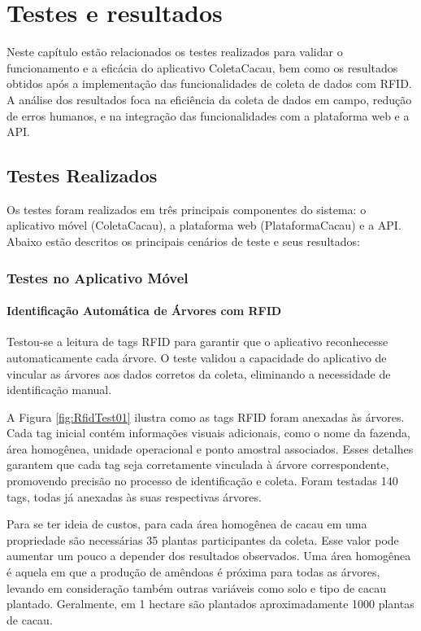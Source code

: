 \chapter{Testes e resultados}

Neste capítulo estão relacionados os testes realizados para validar o funcionamento e a eficácia do aplicativo ColetaCacau, bem como os resultados obtidos após a implementação das funcionalidades de coleta de dados com RFID. A análise dos resultados foca na eficiência da coleta de dados em campo, redução de erros humanos, e na integração das funcionalidades com a plataforma web e a API.

\section{Testes Realizados}

Os testes foram realizados em três principais componentes do sistema: o aplicativo móvel (ColetaCacau), a plataforma web (PlataformaCacau) e a API. Abaixo estão descritos os principais cenários de teste e seus resultados:

\subsection{Testes no Aplicativo Móvel}

\subsubsection{Identificação Automática de Árvores com RFID}
Testou-se a leitura de tags RFID para garantir que o aplicativo reconhecesse automaticamente cada árvore. O teste validou a capacidade do aplicativo de vincular as árvores aos dados corretos da coleta, eliminando a necessidade de identificação manual.

A Figura \ref{fig:RfidTest01} ilustra como as tags RFID foram anexadas às árvores. Cada tag inicial contém informações visuais adicionais, como o nome da fazenda, área homogênea, unidade operacional e ponto amostral associados. Esses detalhes garantem que cada tag seja corretamente vinculada à árvore correspondente, promovendo precisão no processo de identificação e coleta. Foram testadas 140 tags, todas já anexadas às suas respectivas árvores. 

Para se ter ideia de custos, para cada área homogênea de cacau em uma propriedade são necessárias 35 plantas participantes da coleta. Esse valor pode aumentar um pouco a depender dos resultados observados. Uma área homogênea é aquela em que a produção de amêndoas é  próxima para todas as árvores, levando em consideração também outras variáveis como solo e tipo de cacau plantado. Geralmente, em 1 hectare são plantados aproximadamente 1000 plantas de cacau. 

